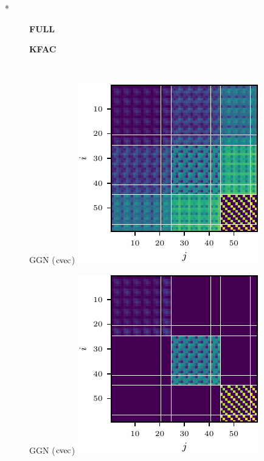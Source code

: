 \switchcolumn[1]*
\begin{figure}[t!]
  \centering
  \begin{minipage}[t]{0.485\linewidth}
    \centering
    \textbf{FULL}
  \end{minipage}
  \hfill
  \begin{minipage}[t]{0.485\linewidth}
    \centering
    \textbf{KFAC}
  \end{minipage}
  \\
  \begin{minipage}[t]{0.485\linewidth}
    \centering
     GGN ($\operatorname{cvec}$)\vspace{1ex}
    \includegraphics[width=0.8\linewidth]{../kfs/plots/synthetic_cvec_ggn_full.pdf}
  \end{minipage}
  \hfill
  \begin{minipage}[t]{0.485\linewidth}
    \centering
    GGN ($\operatorname{cvec}$)\vspace{1ex}
    \includegraphics[width=0.8\linewidth]{../kfs/plots/synthetic_cvec_ggn_kfac.pdf}

\end{minipage}
\end{figure}

